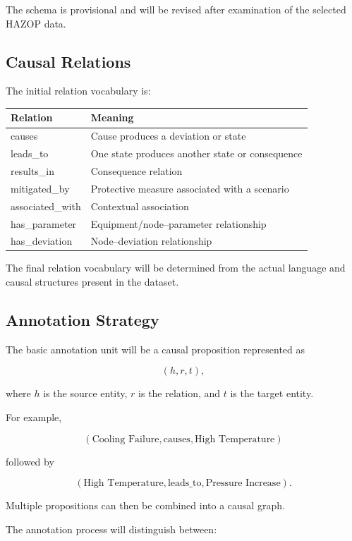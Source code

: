 The schema is provisional and will be revised after examination of the
selected HAZOP data.

\subsection{Causal Relations}

The initial relation vocabulary is:

\begin{center}
\begin{tabular}{ll}
\textbf{Relation} & \textbf{Meaning} \\
\hline
causes & Cause produces a deviation or state \\
leads\_to & One state produces another state or consequence \\
results\_in & Consequence relation \\
mitigated\_by & Protective measure associated with a scenario \\
associated\_with & Contextual association \\
has\_parameter & Equipment/node--parameter relationship \\
has\_deviation & Node--deviation relationship
\end{tabular}
\end{center}

The final relation vocabulary will be determined from the actual
language and causal structures present in the dataset.

\subsection{Annotation Strategy}

The basic annotation unit will be a causal proposition represented as

\[
(h,r,t),
\]

where \(h\) is the source entity, \(r\) is the relation, and \(t\) is
the target entity.

For example,

\[
(\text{Cooling Failure},\text{causes},\text{High Temperature})
\]

followed by

\[
(\text{High Temperature},\text{leads\_to},\text{Pressure Increase}).
\]

Multiple propositions can then be combined into a causal graph.

The annotation process will distinguish between:

